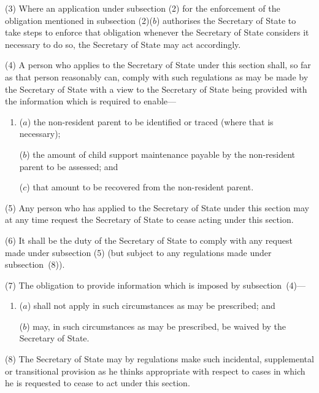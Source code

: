 \documentclass[12pt,a4paper]{article}
\begin{document}
(3)
Where an application under subsection (2) for the enforcement of the
obligation mentioned in subsection (2)($b$) authorises the Secretary of State to take
steps to enforce that obligation whenever the Secretary of State considers it
necessary to do so, the Secretary of State may act accordingly.

(4)
A person who applies to the Secretary of State under this section shall, so
far as that person reasonably can, comply with such regulations as may be made
by the Secretary of State with a view to the Secretary of State being provided
with the information which is required to enable---

\begin{enumerate}\item[]
($a$)
the non-resident parent
to be identified or 
traced (where
that is necessary);

($b$)
the amount of child support maintenance payable by the non-resident parent
to be assessed; and

($c$)
that amount to be recovered from the non-resident parent.
\end{enumerate}

(5)
Any person who has applied to the Secretary of State under this section may
at any time request the Secretary of State to cease acting under this section.

(6)
It shall be the duty of the Secretary of State to comply with any request
made under subsection (5) (but subject to any regulations made under subsection~(8)).

(7)
The obligation to provide information which is imposed by subsection~(4)---
\begin{enumerate}\item[]
($a$)
shall not apply in such circumstances as may be prescribed; and

($b$)
may, in such circumstances as may be prescribed, be waived by the Secretary of State.
\end{enumerate}

(8)
The Secretary of State may by regulations make such incidental, supplemental or transitional provision as he thinks appropriate with respect to cases
in which he is requested to cease to act under this section.
\end{document}
